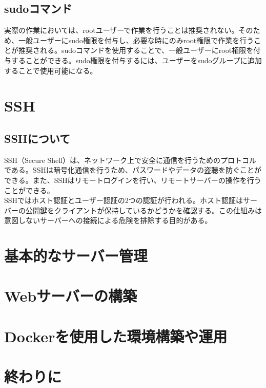 \documentclass[a4paper, 11pt, dvipdfmx]{jsarticle}
\begin{document}
\subsection{sudoコマンド}
実際の作業においては、rootユーザーで作業を行うことは推奨されない。そのため、一般ユーザーにsudo権限を付与し、必要な時にのみroot権限で作業を行うことが推奨される。sudoコマンドを使用することで、一般ユーザーにroot権限を付与することができる。sudo権限を付与するには、ユーザーをsudoグループに追加することで使用可能になる。
\section{SSH}
\subsection{SSHについて}
SSH（Secure Shell）は、ネットワーク上で安全に通信を行うためのプロトコルである。SSHは暗号化通信を行うため、パスワードやデータの盗聴を防ぐことができる。また、SSHはリモートログインを行い、リモートサーバーの操作を行うことができる。\\
SSHではホスト認証とユーザー認証の2つの認証が行われる。ホスト認証はサーバーの公開鍵をクライアントが保持しているかどうかを確認する。この仕組みは意図しないサーバーへの接続による危険を排除する目的がある。
\section{基本的なサーバー管理}

\section{Webサーバーの構築}

\section{Dockerを使用した環境構築や運用}

\section{終わりに}
\end{document}
